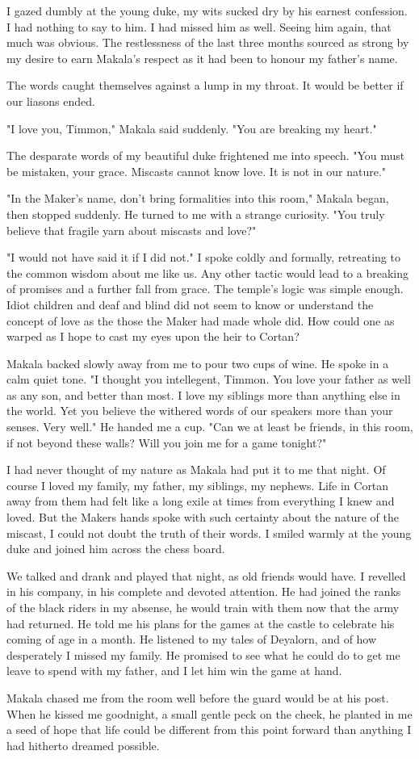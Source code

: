 \documentclass{article}
\begin{document}
I gazed dumbly at the young duke, my wits sucked dry by his earnest confession. I had nothing to say to him. I had missed him as well. Seeing him again, that much was obvious. The restlessness of the last three months sourced as strong by my desire to earn Makala's respect as it had been to honour my father's name. 

The words caught themselves against a lump in my throat. It would be better if our liasons ended. 

"I love you, Timmon," Makala said suddenly. "You are breaking my heart."

The desparate words of my beautiful duke frightened me into speech. "You must be mistaken, your grace. Miscasts cannot know love. It is not in our nature."

"In the Maker's name, don't bring formalities into this room," Makala began, then stopped suddenly. He turned to me with a strange curiosity. "You truly believe that fragile yarn about miscasts and love?"

"I would not have said it if I did not." I spoke coldly and formally, retreating to the common wisdom about me like us. Any other tactic would lead to a breaking of promises and a further fall from grace. The temple's logic was simple enough. Idiot children and deaf and blind did not seem to know or understand the concept of love as the those the Maker had made whole did. How could one as warped as I hope to cast my eyes upon the heir to Cortan?

Makala backed slowly away from me to pour two cups of wine. He spoke in a calm quiet tone. "I thought you intellegent, Timmon. You love your father as well as any son, and better than most. I love my siblings more than anything else in the world. Yet you believe the withered words of our speakers more than your senses. Very well." He handed me a cup. "Can we at least be friends, in this room, if not beyond these walls? Will you join me for a game tonight?"

I had never thought of my nature as Makala had put it to me that night. Of course I loved my family, my father, my siblings, my nephews. Life in Cortan away from them had felt like a long exile at times from everything I knew and loved. But the Makers hands spoke with such certainty about the nature of the miscast, I could not doubt the truth of their words. I smiled warmly at the young duke and joined him across the chess board. 

We talked and drank and played that night, as old friends would have. I revelled in his company, in his complete and devoted attention. He had joined the ranks of the black riders in my absense, he would train with them now that the army had returned. He told me his plans for the games at the castle to celebrate his coming of age in a month. He listened to my tales of Deyalorn, and of how desperately I missed my family. He promised to see what he could do to get me leave to spend with my father, and I let him win the game at hand.

Makala chased me from the room well before the guard would be at his post. When he kissed me goodnight, a small gentle peck on the cheek, he planted in me a seed of hope that life could be different from this point forward than anything I had hitherto dreamed possible. 
\end{document}
